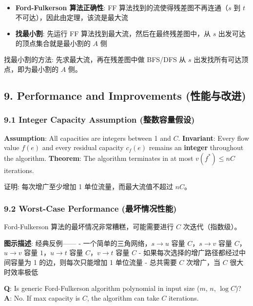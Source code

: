 \documentclass[10pt,a4paper,openany]{ctexbook}
\theoremstyle{definition}
\theoremstyle{remark}
\renewenvironment{quote}
  {\list{}{\leftmargin=1em\rightmargin=0pt\topsep=0.5pt\partopsep=0pt}\item[]}
  {\endlist}
\begin{document}
\begin{itemize}
\item \textbf{Ford-Fulkerson 算法正确性}: FF 算法找到的流使得残差图不再连通（$s$ 到 $t$ 不可达），因此由定理，该流是最大流
\item \textbf{找最小割}: 先运行 FF 算法找到最大流，然后在最终残差图中，从 $s$ 出发可达的顶点集合就是最小割的 $A$ 侧
\end{itemize}

\begin{quote}
找最小割的方法: 先求最大流，再在残差图中做 BFS/DFS 从 $s$ 出发找所有可达顶点，即为最小割的 $A$ 侧。

\end{quote}
\vspace{-2pt}

\subsection{9. Performance and Improvements (性能与改进)}

\subsubsection{9.1 Integer Capacity Assumption (整数容量假设)}

\textbf{Assumption}: All capacities are integers between 1 and $C$.
\textbf{Invariant}: Every flow value $f(e)$ and every residual capacity $c_f(e)$ remains an \textbf{integer} throughout the algorithm.
\textbf{Theorem}: The algorithm terminates in at most $v(f^*) \le nC$ iterations.
\begin{quote}
证明: 每次增广至少增加 1 单位流量，而最大流值不超过 $nC$。

\end{quote}

\subsubsection{9.2 Worst-Case Performance (最坏情况性能)}

Ford-Fulkerson 算法的最坏情况非常糟糕，可能需要进行 $C$ 次迭代（指数级）。
\begin{quote}
\textbf{图示描述}: 经典反例——
- 一个简单的三角网络，$s \to u$ 容量 $C$，$s \to v$ 容量 $C$，$u \to v$ 容量 $1$，$u \to t$ 容量 $C$，$v \to t$ 容量 $C$
- 如果每次选择的增广路径都经过中间容量为 1 的边，则每次只能增加 1 单位流量
- 总共需要 $C$ 次增广，当 $C$ 很大时效率极低

\textbf{Q}: Is generic Ford-Fulkerson algorithm polynomial in input size ($m$, $n$, $\log C$)?
\textbf{A}: No. If max capacity is $C$, the algorithm can take $C$ iterations.

\end{quote}
\end{document}
